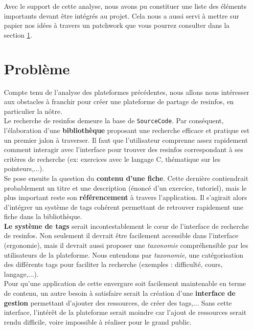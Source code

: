 Avec le support de cette analyse, nous avons pu constituer une liste des éléments importants devant être intégrés au projet. Cela nous a aussi servi à mettre sur papier nos idées à travers un patchwork que vous pourrez consulter dans la section \ref{section:problem}.


\section{Problème}
\label{section:problem}

Compte tenu de l'analyse des plateformes précédentes, nous allons nous intéresser aux obstacles à franchir pour créer une plateforme de partage de \glspl{resinfo}, en particulier la nôtre.\\

Le recherche de \glspl{resinfo} demeure la base de \texttt{SourceCode}. Par conséquent, l'élaboration d'une \textbf{bibliothèque} proposant une recherche efficace et pratique est un premier jalon à traverser. Il faut que l'utilisateur comprenne assez rapidement comment interagir avec l'interface pour trouver des \glspl{resinfo} correspondant à ses critères de recherche (ex: exercices avec le langage C, thématique sur les pointeurs,...).\\

Se pose ensuite la question du \textbf{contenu d'une \gls{fiche}}. Cette dernière contiendrait probablement un titre et une description (énoncé d'un exercice, tutoriel), mais le plus important reste son \textbf{référencement} à travers l'application. Il s'agirait alors d'intégrer un système de \glspl{tag} cohérent permettant de retrouver rapidement une \gls{fiche} dans la bibliothèque.\\

\textbf{Le système de \glspl{tag}} serait incontestablement le cœur de l'interface de recherche de \glspl{resinfo}. Non seulement il devrait être facilement accessible dans l'interface (ergonomie), mais il devrait aussi proposer une \textit{taxonomie} compréhensible par les utilisateurs de la plateforme. Nous entendons par \textit{taxonomie}, une catégorisation des différents \glspl{tag} pour faciliter la recherche (exemples : difficulté, cours, langage,...).\\

Pour qu'une application de cette envergure soit facilement maintenable en terme de contenu, un autre besoin à satisfaire serait la création d'une \textbf{interface de gestion} permettant d'ajouter des ressources, de créer des \glspl{tag},... Sans cette interface, l'intérêt de la plateforme serait moindre car l'ajout de ressources serait rendu difficile, voire impossible à réaliser pour le grand public.\\

